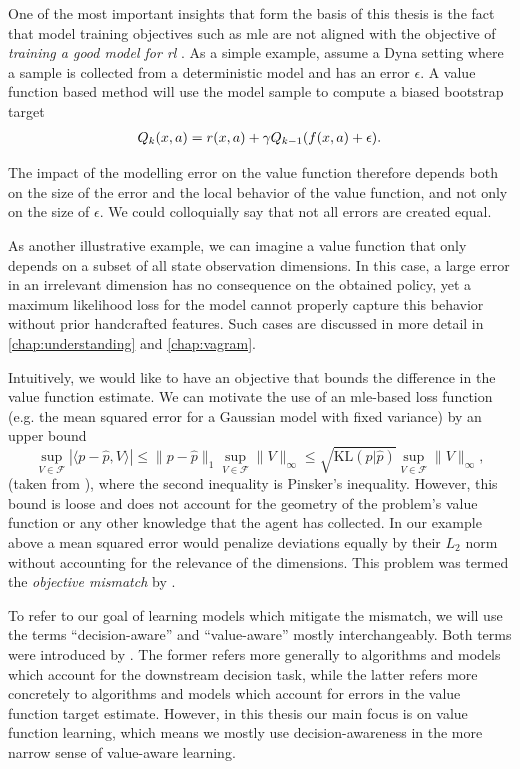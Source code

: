 One of the most important insights that form the basis of this thesis is the fact that model training objectives such as \ac{mle} are not aligned with the objective of \emph{training a good model for \ac{rl}} \parencite{schneider1997exploiting,joseph2013reinforcement,vaml,lambert202objective}.
As a simple example, assume a Dyna setting where a sample is collected from a deterministic model and has an error $\epsilon$.
A value function based method will use the model sample to compute a biased bootstrap target
\begin{align}
    Q_k(x,a) = r(x,a) + \gamma Q_{k-1}(f(x, a) + \epsilon).
\end{align}

The impact of the modelling error on the value function therefore depends both on the size of the error and the local behavior of the value function, and not only on the size of $\epsilon$. 
We could colloquially say that not all errors are created equal.

As another illustrative example, we can imagine a value function that only depends on a subset of all state observation dimensions. 
In this case, a large error in an irrelevant dimension has no consequence on the obtained policy, yet a maximum likelihood loss for the model cannot properly capture this behavior without prior handcrafted features.
Such cases are discussed in more detail in \autoref{chap:understanding} and \autoref{chap:vagram}.

Intuitively, we would like to have an objective that bounds the difference in the value function estimate.
We can motivate the use of an \ac{mle}-based loss function (e.g. the mean squared error for a Gaussian model with fixed variance) {by an upper bound}
$$\sup_{V \in \mathcal{F}}|\langle p - \hat{p}, V\rangle|\leq \|p - \hat{p}\|_1 \sup_{V \in \mathcal{F}}\|V\|_\infty \leq \sqrt{\text{KL}(p|\hat{p})}\sup_{V \in \mathcal{F}}\|V\|_\infty,$$
(taken from
\textcite{vaml}), where the second inequality is Pinsker's inequality.
However, this bound is loose and does not account for the geometry of the problem's value function or any other knowledge that the agent has collected. 
In our example above a mean squared error would penalize deviations equally by their $L_2$ norm without accounting for the relevance of the dimensions.
This problem was termed the \emph{objective mismatch} by \textcite{lambert202objective}.

To refer to our goal of learning models which mitigate the mismatch, we will use the terms ``decision-aware'' and ``value-aware'' mostly interchangeably.
Both terms were introduced by \textcite{vaml}.
The former refers more generally to algorithms and models which account for the downstream decision task, while the latter refers more concretely to algorithms and models which account for errors in the value function target estimate.
However, in this thesis our main focus is on value function learning, which means we mostly use decision-awareness in the more narrow sense of value-aware learning.

